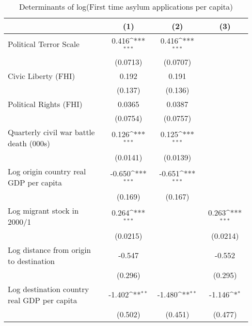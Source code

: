 \begin{table}[htbp]\centering
\def\sym#1{\ifmmode^{#1}\else\(^{#1}\)\fi}
\caption{Determinants of log(First time asylum applications per capita)}
\begin{tabular}{l*{3}{c}}
\hline\hline
                    &\multicolumn{1}{c}{(1)}         &\multicolumn{1}{c}{(2)}         &\multicolumn{1}{c}{(3)}         \\
\hline
Political Terror Scale&       0.416\sym{***}&       0.416\sym{***}&                     \\
                    &    (0.0713)         &    (0.0707)         &                     \\
[1em]
Civic Liberty (FHI) &       0.192         &       0.191         &                     \\
                    &     (0.137)         &     (0.136)         &                     \\
[1em]
Political Rights (FHI)&      0.0365         &      0.0387         &                     \\
                    &    (0.0754)         &    (0.0757)         &                     \\
[1em]
Quarterly civil war battle death (000s)&       0.126\sym{***}&       0.125\sym{***}&                     \\
                    &    (0.0141)         &    (0.0139)         &                     \\
[1em]
Log origin country real GDP per capita&      -0.650\sym{***}&      -0.651\sym{***}&                     \\
                    &     (0.169)         &     (0.167)         &                     \\
[1em]
Log migrant stock in 2000/1&       0.264\sym{***}&                     &       0.263\sym{***}\\
                    &    (0.0215)         &                     &    (0.0214)         \\
[1em]
Log distance from origin to destination&      -0.547         &                     &      -0.552         \\
                    &     (0.296)         &                     &     (0.295)         \\
[1em]
Log destination country real GDP per capita&      -1.402\sym{**} &      -1.480\sym{**} &      -1.146\sym{*}  \\
                    &     (0.502)         &     (0.451)         &     (0.477)         \\

\end{tabular}
\end{table}
